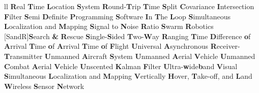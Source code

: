 \begin{abbreviations}{ll}
    		{\textbf{R}eal \textbf{T}ime \textbf{L}ocation \textbf{S}ystem}
    		{\textbf{R}ound-\textbf{T}rip \textbf{T}ime}
    		{\textbf{S}plit \textbf{C}ovariance \textbf{I}ntersection \textbf{F}ilter}
    		{\textbf{S}emi \textbf{D}efinite \textbf{P}rogramming}
    		{\textbf{S}oftware \textbf{I}n \textbf{T}he \textbf{L}oop}
    		{\textbf{S}imultaneous \textbf{L}ocalization and \textbf{M}apping}
    		{\textbf{S}ignal to \textbf{N}oise \textbf{R}atio}
    			{\textbf{S}warm \textbf{R}obotics}
    [SandR]{\textbf{S}earch \textbf{\&} \textbf{R}escue}
    		{\textbf{S}ingle-\textbf{S}ided \textbf{T}wo-\textbf{W}ay \textbf{R}anging}
    		{\textbf{T}ime \textbf{D}ifference \textbf{o}f \textbf{A}rrival}
    		{\textbf{T}ime \textbf{o}f \textbf{A}rrival}
    		{\textbf{T}ime \textbf{o}f \textbf{F}light}
    		{\textbf{U}niversal \textbf{Α}synchronous \textbf{R}eceiver-\textbf{T}ransmitter}
    		{\textbf{U}nmanned \textbf{A}ircraft \textbf{S}ystem}
    		{\textbf{U}nmanned \textbf{A}erial \textbf{V}ehicle}
    		{\textbf{U}nmanned \textbf{C}ombat \textbf{A}erial \textbf{V}ehicle}
    		{\textbf{U}nscented \textbf{K}alman \textbf{F}ilter}
    		{\textbf{U}ltra-\textbf{w}ide\textbf{b}and}
    		{\textbf{V}isual \textbf{S}imultaneous \textbf{L}ocalization and \textbf{M}apping}
    		{\textbf{V}ertically \textbf{H}over, \textbf{T}ake-off, and \textbf{L}and}
    		{\textbf{W}ireless \textbf{S}ensor \textbf{N}etwork}
\end{abbreviations}
